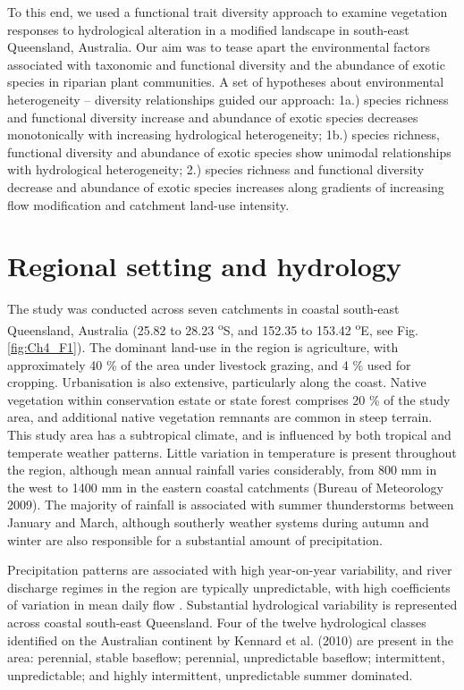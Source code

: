 \documentclass[openright,12pt,a4paper]{memoir}
\begin{document}
To this end, we used a functional trait diversity approach to examine vegetation responses to hydrological alteration in a modified landscape in south-east Queensland, Australia. Our aim was to tease apart the environmental factors associated with taxonomic and functional diversity and the abundance of exotic species in riparian plant communities. A set of hypotheses about environmental heterogeneity – diversity relationships guided our approach:  1a.) species richness and functional diversity increase and abundance of exotic species decreases monotonically with increasing hydrological heterogeneity; 1b.) species richness, functional diversity and abundance of exotic species show unimodal relationships with hydrological heterogeneity; 2.) species richness and functional diversity decrease and abundance of exotic species increases along gradients of increasing flow modification and catchment land-use intensity.

\section{Regional setting and hydrology}
The study was conducted across seven catchments in coastal south-east Queensland, Australia (25.82 to 28.23 \textsuperscript{o}S, and 152.35 to 153.42 \textsuperscript{o}E, see Fig. \ref{fig:Ch4_F1}). The dominant land-use in the region is agriculture, with approximately 40 \% of the area under livestock grazing, and 4 \% used for cropping. Urbanisation is also extensive, particularly along the coast. Native vegetation within conservation estate or state forest comprises 20 \% of the study area, and additional native vegetation remnants are common in steep terrain.  This study area has a subtropical climate, and is influenced by both tropical and temperate weather patterns. Little variation in temperature is present throughout the region, although mean annual rainfall varies considerably, from 800 mm in the west to 1400 mm in the eastern coastal catchments (Bureau of Meteorology 2009). The majority of rainfall is associated with summer thunderstorms between January and March, although southerly weather systems during autumn and winter are also responsible for a substantial amount of precipitation. 

Precipitation patterns are associated with high year-on-year variability, and river discharge regimes in the region are typically unpredictable, with high coefficients of variation in mean daily flow \citep{Rustomji2009, Kennard2010}. Substantial hydrological variability is represented across coastal south-east Queensland. Four of the twelve hydrological classes identified on the Australian continent by Kennard et al. (2010) are present in the area: perennial, stable baseflow; perennial, unpredictable baseflow; intermittent, unpredictable; and highly intermittent, unpredictable summer dominated.
\end{document}
